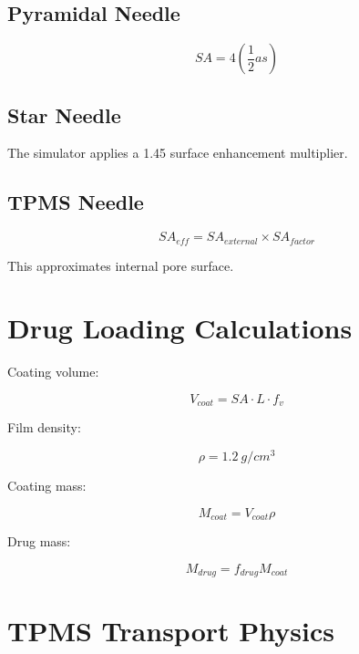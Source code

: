 \documentclass[11pt]{article}
\begin{document}
\subsection{Pyramidal Needle}

\begin{equation}
SA=4\left(\frac12 as\right)
\end{equation}

\subsection{Star Needle}

The simulator applies a 1.45 surface enhancement multiplier.

\subsection{TPMS Needle}

\begin{equation}
SA_{eff}
=SA_{external}\times SA_{factor}
\end{equation}

This approximates internal pore surface.

\section{Drug Loading Calculations}

Coating volume:

\begin{equation}
V_{coat}=SA\cdot L \cdot f_v
\end{equation}

Film density:

\begin{equation}
\rho=1.2\ g/cm^3
\end{equation}

Coating mass:

\begin{equation}
M_{coat}=V_{coat}\rho
\end{equation}

Drug mass:

\begin{equation}
M_{drug}=f_{drug}M_{coat}
\end{equation}

\section{TPMS Transport Physics}
\end{document}
